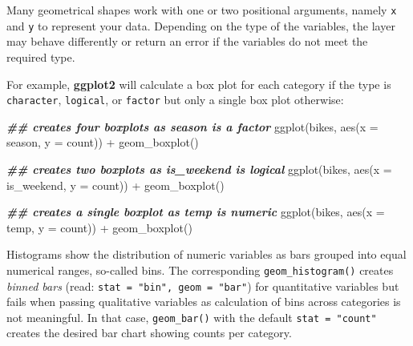 \documentclass[
]{krantz}
\makeatletter
\newenvironment{Shaded}{\begin{snugshade}}{\end{snugshade}}
\newcommand{\AttributeTok}[1]{\textcolor[rgb]{0.61,0.61,0.61}{#1}}
\newcommand{\DocumentationTok}[1]{\textcolor[rgb]{0.37,0.37,0.37}{\textbf{\textit{#1}}}}
\newcommand{\FunctionTok}[1]{\textcolor[rgb]{0,0,0}{#1}}
\newcommand{\NormalTok}[1]{#1}
\newcommand{\SpecialCharTok}[1]{\textcolor[rgb]{0,0,0}{#1}}
\newenvironment{kframe}{%
\medskip{}
\setlength{\fboxsep}{.8em}
 \def\at@end@of@kframe{}%
 \ifinner\ifhmode%
  \def\at@end@of@kframe{\end{minipage}}%
  \begin{minipage}{\columnwidth}%
 \fi\fi%
 \def\FrameCommand##1{\hskip\@totalleftmargin \hskip-\fboxsep
 \colorbox{shadecolor}{##1}\hskip-\fboxsep
     \hskip-\linewidth \hskip-\@totalleftmargin \hskip\columnwidth}%
 \MakeFramed {\advance\hsize-\width
   \@totalleftmargin\z@ \linewidth\hsize
   \@setminipage}}%
 {\par\unskip\endMakeFramed%
 \at@end@of@kframe}
\renewenvironment{Shaded}{\begin{kframe}}{\end{kframe}}
\makeatother
\begin{document}
Many geometrical shapes work with one or two positional arguments, namely \texttt{x} and \texttt{y} to represent your data. Depending on the type of the variables, the layer may behave differently or return an error if the variables do not meet the required type.

For example, \textbf{ggplot2} will calculate a box plot for each category if the type is \texttt{character}, \texttt{logical}, or \texttt{factor} but only a single box plot otherwise:

\begin{Shaded}
\begin{Highlighting}[]
\DocumentationTok{\#\# creates four boxplots as \textasciigrave{}season\textasciigrave{} is a factor}
\FunctionTok{ggplot}\NormalTok{(bikes, }\FunctionTok{aes}\NormalTok{(}\AttributeTok{x =}\NormalTok{ season, }\AttributeTok{y =}\NormalTok{ count)) }\SpecialCharTok{+} \FunctionTok{geom\_boxplot}\NormalTok{()}

\DocumentationTok{\#\# creates two boxplots as \textasciigrave{}is\_weekend\textasciigrave{} is logical}
\FunctionTok{ggplot}\NormalTok{(bikes, }\FunctionTok{aes}\NormalTok{(}\AttributeTok{x =}\NormalTok{ is\_weekend, }\AttributeTok{y =}\NormalTok{ count)) }\SpecialCharTok{+} \FunctionTok{geom\_boxplot}\NormalTok{()}

\DocumentationTok{\#\# creates a single boxplot as \textasciigrave{}temp\textasciigrave{} is numeric}
\FunctionTok{ggplot}\NormalTok{(bikes, }\FunctionTok{aes}\NormalTok{(}\AttributeTok{x =}\NormalTok{ temp, }\AttributeTok{y =}\NormalTok{ count)) }\SpecialCharTok{+} \FunctionTok{geom\_boxplot}\NormalTok{()}
\end{Highlighting}
\end{Shaded}

Histograms show the distribution of numeric variables as bars grouped into equal numerical ranges, so-called bins. The corresponding \texttt{geom\_histogram()} creates \emph{binned bars} (read: \texttt{stat\ =\ "bin",\ geom\ =\ "bar"}) for quantitative variables but fails when passing qualitative variables as calculation of bins across categories is not meaningful. In that case, \texttt{geom\_bar()} with the default \texttt{stat\ =\ "count"} creates the desired bar chart showing counts per category.
\end{document}

